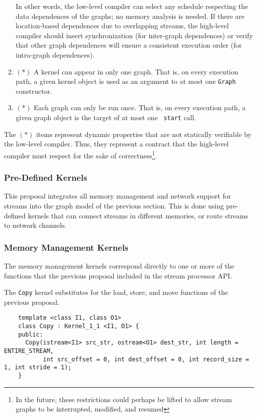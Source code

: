 \begin{enumerate}
In other words, the low-level compiler can select any schedule
respecting the data dependences of the graphs; no memory analysis is
needed.  If there are location-based dependences due to overlapping
streams, the high-level compiler should insert synchronization (for
inter-graph dependences) or verify that other graph dependences will
ensure a consistent execution order (for intra-graph dependences).

\item $(*)$ A kernel can appear in only one graph.  That is, on every
execution path, a given kernel object is used as an argument to at
most one {\tt Graph} constructor.

\item $(*)$ Each graph can only be run once.  That is, on every
execution path, a given graph object is the target of at most one {\tt
start} call.

\end{enumerate}

The $(*)$ items represent dynamic properties that are not statically
verifiable by the low-level compiler.  Thus, they represent a contract
that the high-level compiler must respect for the sake of
correctness\footnote{In the future, these restrictions could perhaps
be lifted to allow stream graphs to be interrupted, modified, and
resumed}.

\subsubsection{Pre-Defined Kernels}
\label{sec:predef}

This proposal integrates all memory management and network support for
streams into the graph model of the previous section.  This is done
using pre-defined kernels that can connect streams in different
memories, or route streams to network channels.

\subsubsection*{Memory Management Kernels}

The memory management kernels correspond directly to one or more of
the functions that the previous proposal included in the stream
processor API.

 The {\tt Copy} kernel substitutes for the load, store, and move
functions of the previous proposal.
{\small
\begin{verbatim}
    template <class I1, class O1> 
    class Copy : Kernel_1_1 <I1, O1> {
    public:
      Copy(istream<I1> src_str, ostream<O1> dest_str, int length = ENTIRE_STREAM,
           int src_offset = 0, int dest_offset = 0, int record_size = 1, int stride = 1);
    }
\end{verbatim}}

